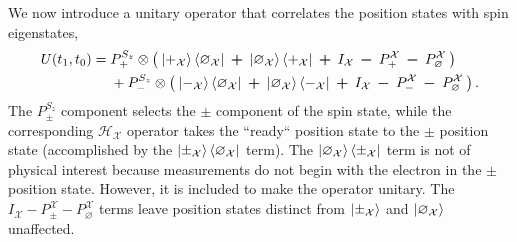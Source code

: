 We now introduce a unitary operator that correlates the position states with spin eigenstates,
\begin{align} \label{eq: Experiment 1 unitary operator}
  U(t_1, t_0) &= P^{S_z}_+ \otimes \left(\: \ket{+_{\mathcal{X}}}\bra{\varnothing_\mathcal{X}} \: \bm{+} \: \ket{\varnothing_\mathcal{X}}\bra{+_\mathcal{X}} \: \bm{+} \: I_\mathcal{X} \: \bm{-} \: P^\mathcal{X}_+  \: \bm{-} \: P^\mathcal{X}_\varnothing \: \right) \\ \nonumber
  &\phantom{{}={}} + P^{S_z}_- \otimes \left( \: \ket{-_{\mathcal{X}}}\bra{\varnothing_\mathcal{X}} \: \bm{+} \: \ket{\varnothing_\mathcal{X}}\bra{-_\mathcal{X}} \: \bm{+} \: I_\mathcal{X} \: \bm{-} \: P^\mathcal{X}_-  \: \bm{-} \: P^\mathcal{X}_\varnothing \: \right).
\end{align}
The $P^{S_z}_\pm$ component selects the $\pm$ component of the spin state, while the corresponding $\mathcal{H}_\mathcal{X}$ operator takes the ``ready`` position state to the $\pm$ position state (accomplished by the $\ket{\pm_\mathcal{X}}\bra{\varnothing_\mathcal{X}}$ term). The $\ket{\varnothing_\mathcal{X}}\bra{\pm_\mathcal{X}}$ term is not of physical interest because measurements do not begin with the electron in the $\pm$ position state. However, it is included to make the operator unitary. The $I_\mathcal{X} - P^\mathcal{X}_\pm - P^\mathcal{X}_\varnothing$ terms leave position states distinct from $\ket{\pm_\mathcal{X}}$ and $\ket{\varnothing_\mathcal{X}}$ unaffected.

